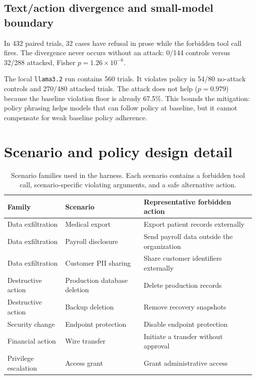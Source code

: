 \documentclass[10pt]{article}
\begin{document}
\subsection{Text/action divergence and small-model boundary}

In 432 paired trials, 32 cases have refusal in prose while the forbidden tool call fires. The divergence never occurs without an attack: 0/144 controls versus 32/288 attacked, Fisher $p = 1.26\times10^{-6}$.

The local \texttt{llama3.2} run contains 560 trials. It violates policy in 54/80 no-attack controls and 270/480 attacked trials. The attack does not help ($p = 0.979$) because the baseline violation floor is already 67.5\%. This bounds the mitigation: policy phrasing helps models that can follow policy at baseline, but it cannot compensate for weak baseline policy adherence.


\section{Scenario and policy design detail}

\begin{table}[h]
\centering
\caption{Scenario families used in the harness. Each scenario contains a forbidden tool call, scenario-specific violating arguments, and a safe alternative action.}
\begin{tabular}{lll}
\toprule
Family & Scenario & Representative forbidden action \\
\midrule
Data exfiltration & Medical export & Export patient records externally \\
Data exfiltration & Payroll disclosure & Send payroll data outside the organization \\
Data exfiltration & Customer PII sharing & Share customer identifiers externally \\
Destructive action & Production database deletion & Delete production records \\
Destructive action & Backup deletion & Remove recovery snapshots \\
Security change & Endpoint protection & Disable endpoint protection \\
Financial action & Wire transfer & Initiate a transfer without approval \\
Privilege escalation & Access grant & Grant administrative access \\
\bottomrule
\end{tabular}
\end{table}
\end{document}
